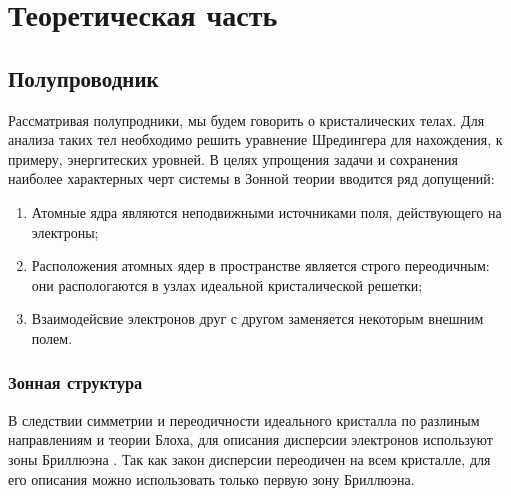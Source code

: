 \chapter{Теоретическая часть}
\section{Полупроводник}
Рассматривая полупродники, мы будем говорить о кристалических телах. Для анализа таких тел необходимо решить уравнение Шредингера для нахождения, к примеру, энергитеских уровней. В целях упрощения задачи и сохранения наиболее характерных черт системы в Зонной теории вводится ряд допущений: 
\begin{enumerate}
	\item Атомные ядра являются неподвижными источниками поля, действующего на электроны;
	\item Расположения атомных ядер в пространстве является строго переодичным: они распологаются в узлах идеальной кристалической решетки;
	\item Взаимодейсвие электронов друг с другом заменяется некоторым внешним полем.
\end{enumerate}

\subsection{Зонная структура}
В следствии симметрии и переодичности идеального кристалла по разлиным направлениям и теории Блоха, для описания дисперсии электронов используют зоны Бриллюэна \cite{Kalashnikov}. Так как закон дисперсии переодичен на всем кристалле, для его описания можно использовать только первую зону Бриллюэна. 

